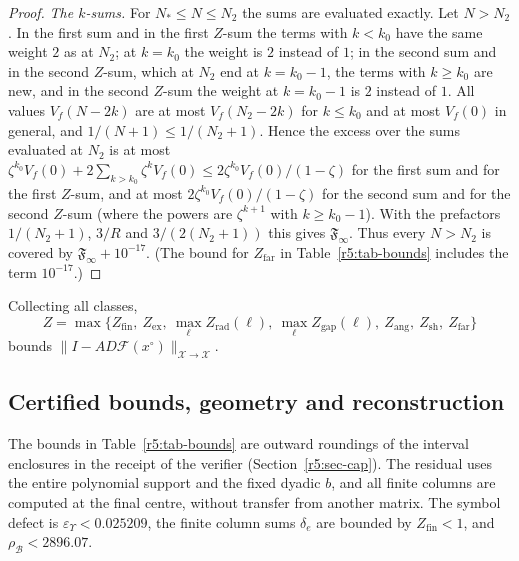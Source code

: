 \documentclass[11pt]{amsart}
\theoremstyle{definition}
\theoremstyle{remark}
\numberwithin{equation}{section}
\newcommand{\Fc}{\mathcal{F}}
\newcommand{\eps}{\varepsilon}
\newcommand{\nrm}[1]{\lVert #1\rVert}
\begin{document}
\begin{proof}
\emph{The $k$-sums.} For $N_*\leq N\leq N_2$ the sums are evaluated exactly. Let $N>N_2$. In the first sum and in the first $Z$-sum the terms with $k<k_0$ have the same weight $2$ as at $N_2$; at $k=k_0$ the weight is $2$ instead of $1$; in the second sum and in the second $Z$-sum, which at $N_2$ end at $k=k_0-1$, the terms with $k\geq k_0$ are new, and in the second $Z$-sum the weight at $k=k_0-1$ is $2$ instead of $1$. All values $V_f(N-2k)$ are at most $V_f(N_2-2k)$ for $k\leq k_0$ and at most $V_f(0)$ in general, and $1/(N+1)\leq1/(N_2+1)$. Hence the excess over the sums evaluated at $N_2$ is at most $\zeta^{k_0}V_f(0)+2\sum_{k>k_0}\zeta^kV_f(0)\leq2\zeta^{k_0}V_f(0)/(1-\zeta)$ for the first sum and for the first $Z$-sum, and at most $2\zeta^{k_0}V_f(0)/(1-\zeta)$ for the second sum and for the second $Z$-sum (where the powers are $\zeta^{k+1}$ with $k\geq k_0-1$). With the prefactors $1/(N_2+1)$, $3/R$ and $3/(2(N_2+1))$ this gives $\mathfrak F_\infty$. Thus every $N>N_2$ is covered by $\mathfrak F_\infty+10^{-17}$. (The bound for $Z_{\mathrm{far}}$ in Table~\ref{r5:tab-bounds} includes the term $10^{-17}$.)
\end{proof}

Collecting all classes,
\[
Z=\max\big\{Z_{\mathrm{fin}},\ Z_{\mathrm{ex}},\ \max_\ell Z_{\mathrm{rad}}(\ell),\ \max_\ell Z_{\mathrm{gap}}(\ell),\ Z_{\mathrm{ang}},\ Z_{\mathrm{sh}},\ Z_{\mathrm{far}}\big\}
\]
bounds $\nrm{I-AD\Fc(x^\circ)}_{\mathcal X\to\mathcal X}$.

\subsection{Certified bounds, geometry and reconstruction}\label{r5:sec-zero}

The bounds in Table~\ref{r5:tab-bounds} are outward roundings of the interval enclosures in the receipt of the verifier (Section~\ref{r5:sec-cap}). The residual uses the entire polynomial support and the fixed dyadic $b$, and all finite columns are computed at the final centre, without transfer from another matrix. The symbol defect is $\eps_\Upsilon<0.025209$, the finite column sums $\delta_e$ are bounded by $Z_{\mathrm{fin}}<1$, and $\rho_{\mathcal B}<2896.07$.
\end{document}
